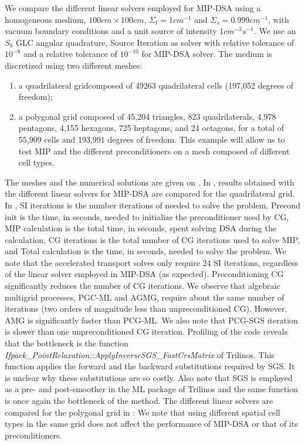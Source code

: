 We compare the different linear solvers employed for MIP-DSA using a homogeneous medium, $100cm
\times 100cm$, $\Sigma_t = 1cm^{-1}$ and $\Sigma_s = 0.999cm^{-1}$, with
vacuum boundary conditions and a unit source of intensity $1cm^{-3}s^{-1}$. We
use an $S_8$ GLC angular quadrature, Source Iteration as solver
with relative tolerance of $10^{-8}$ and a relative tolerance of
$10^{-10}$ for MIP-DSA solver. The medium is discretized using two different meshes:
\begin{enumerate}
  \item a quadrilateral gridcomposed of 49263 quadrilateral
    cells (197,052 degrees of freedom); 
  \item a polygonal grid composed of 45,204 triangles, 823
    quadrilaterals, 4,978 pentagons, 4,155 hexagons, 725 heptagons, and 24
    octagons, for a total of 55,909 cells and 193,991 degrees of freedom. This
    example will allow us to test MIP and the different preconditioners on a
    mesh composed of different cell types.
\end{enumerate}
%
The meshes and the numerical solutions are given on .
In , results obtained with the different linear solvers for MIP-DSA 
are compared for the quadrilateral grid.
In , SI iterations is the number iterations of 
needed to solve the problem, Precond init is the time, in
seconds, needed to initialize the preconditioner used by CG, MIP calculation
is the total time, in seconds, spent solving DSA during the calculation, CG
iterations is the total number of CG iterations used to solve MIP, and Total
calculation is the time, in seconds, needed to solve the problem. 
We note that the accelerated transport solves only require 24 SI iterations, regardless of the linear solver
employed in MIP-DSA (as expected). Preconditioning CG significantly reduces the number of CG iterations.
%
We observe that algebraic multigrid processes, PGC-ML and AGMG, require 
about the same number of iterations (two orders of magnitude less than unpreconditioned CG). 
However, AMG is significantly faster than PCG-ML. We also note that PCG-SGS iteration is 
slower than one unpreconditioned CG iteration. Profiling of the code reveals that the
bottleneck is the function \emph{Ifpack\_PointRelaxation::ApplyInverseSGS\_FastCrsMatrix} 
of Trilinos. This function applies the forward and the backward substitutions required by SGS.
It is unclear why these substitutions are so costly. Also note that SGS is employed as
a pre- and post-smoother in the ML package of Trilinos and the same function
is once again the bottleneck of the method.
%
The different linear solvers are compared for the polygonal grid in :
We note that using different spatial cell types in the same grid does not affect
the performance of MIP-DSA or that of its preconditioners.

